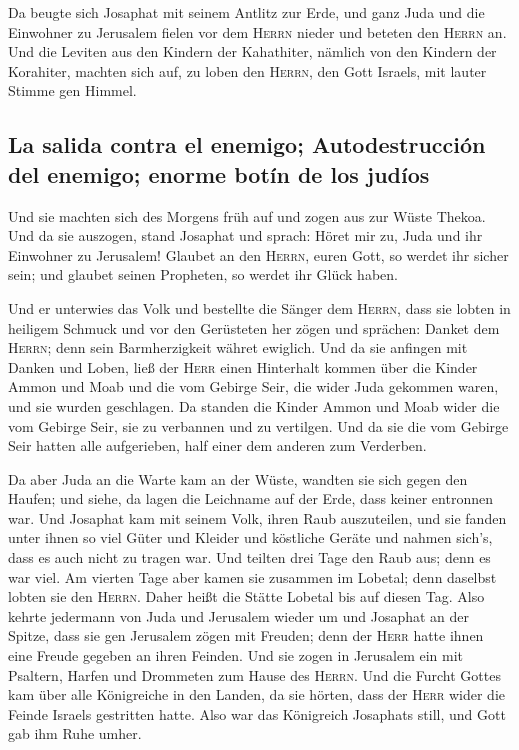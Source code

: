  Da beugte sich Josaphat mit seinem Antlitz zur Erde, und
ganz Juda und die Einwohner zu Jerusalem fielen vor dem \textsc{Herrn}
nieder und beteten den \textsc{Herrn} an.  Und die
Leviten aus den Kindern der Kahathiter, nämlich von den Kindern der
Korahiter, machten sich auf, zu loben den \textsc{Herrn}, den Gott
Israels, mit lauter Stimme gen Himmel.

\hypertarget{la-salida-contra-el-enemigo-autodestrucciuxf3n-del-enemigo-enorme-botuxedn-de-los-juduxedos}{%
\subsection{La salida contra el enemigo; Autodestrucción del enemigo;
enorme botín de los
judíos}\label{la-salida-contra-el-enemigo-autodestrucciuxf3n-del-enemigo-enorme-botuxedn-de-los-juduxedos}}

 Und sie machten sich des Morgens früh auf und zogen aus
zur Wüste Thekoa. Und da sie auszogen, stand Josaphat und sprach: Höret
mir zu, Juda und ihr Einwohner zu Jerusalem! Glaubet an den
\textsc{Herrn}, euren Gott, so werdet ihr sicher sein; und glaubet
seinen Propheten, so werdet ihr Glück haben.

 Und er unterwies das Volk und bestellte die Sänger dem
\textsc{Herrn}, dass sie lobten in heiligem Schmuck und vor den
Gerüsteten her zögen und sprächen: Danket dem \textsc{Herrn}; denn sein
Barmherzigkeit währet ewiglich.  Und da sie anfingen mit
Danken und Loben, ließ der \textsc{Herr} einen Hinterhalt kommen über
die Kinder Ammon und Moab und die vom Gebirge Seir, die wider Juda
gekommen waren, und sie wurden geschlagen.  Da standen
die Kinder Ammon und Moab wider die vom Gebirge Seir, sie zu verbannen
und zu vertilgen. Und da sie die vom Gebirge Seir hatten alle
aufgerieben, half einer dem anderen zum Verderben.

 Da aber Juda an die Warte kam an der Wüste, wandten sie
sich gegen den Haufen; und siehe, da lagen die Leichname auf der Erde,
dass keiner entronnen war.  Und Josaphat kam mit seinem
Volk, ihren Raub auszuteilen, und sie fanden unter ihnen so viel Güter
und Kleider und köstliche Geräte und nahmen sich's, dass es auch nicht
zu tragen war. Und teilten drei Tage den Raub aus; denn es war viel.
 Am vierten Tage aber kamen sie zusammen im Lobetal; denn
daselbst lobten sie den \textsc{Herrn}. Daher heißt die Stätte Lobetal
bis auf diesen Tag.  Also kehrte jedermann von Juda und
Jerusalem wieder um und Josaphat an der Spitze, dass sie gen Jerusalem
zögen mit Freuden; denn der \textsc{Herr} hatte ihnen eine Freude
gegeben an ihren Feinden.  Und sie zogen in Jerusalem ein
mit Psaltern, Harfen und Drommeten zum Hause des \textsc{Herrn}.
 Und die Furcht Gottes kam über alle Königreiche in den
Landen, da sie hörten, dass der \textsc{Herr} wider die Feinde Israels
gestritten hatte.  Also war das Königreich Josaphats
still, und Gott gab ihm Ruhe umher.

